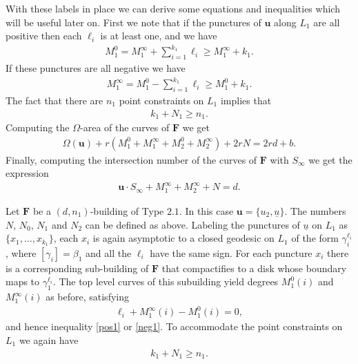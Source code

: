 \documentclass[12pt]{amsart}
\theoremstyle{definition}
\begin{document}
With these labels in place we can derive some equations and inequalities  which will be useful later on. First we note that if the punctures of $\mathbf{u}$ along $L_1$ are all positive then each $\ell_i$ is at least one, and we have 
\begin{align}\label{pos1}
M_1^0 = M_1^\infty + \sum_{i=1}^{k_1} \ell_i \geq M_1^\infty + k_1.
\end{align}
If these punctures are all negative we have 
\begin{align}\label{neg1}
M_1^\infty = M_1^0 - \sum_{i=1}^{k_1} \ell_i \geq M_1^0 + k_1.
\end{align}
The fact that there are  $n_1$ point constraints on $L_1$ implies that 
\begin{align}\label{constraint1}
k_1 + N_1 \geq n_1. 
\end{align}
Computing the $\Omega$-area of the curves of  $\mathbf{F}$ we get
\begin{align}\label{area1}
\Omega (\mathbf{u})+ r(M_1^0 +M_1^\infty + M_2^0 + M_2^\infty)+2rN = 2rd+b.  
\end{align}
Finally, computing the intersection number of the curves of $\mathbf{F}$ with $S_{\infty}$ we get the expression
\begin{align}\label{S1}
\mathbf{u} \cdot S_{\infty}+ M_1^\infty + M_2^\infty + N  =  d.
\end{align}


Let $\mathbf{F}$ be a $(d,n_1)$-building of Type $2.1$. In this case  $\mathbf{u} = \{u_2,\underline{u}\}$. The numbers $N$, $N_0$, $N_1$ and $N_2$ can be defined as above. Labeling the punctures of $\underline{u}$  on $L_1$ as  $\{x_1, \dots, x_{k_1}\}$, each $x_i$ is again asymptotic to a closed geodesic on $L_1$ of the form $\gamma_i^{\ell_i}$, where $[\gamma_i] =\beta_1$ and all the $\ell_i$ have the same sign. For each puncture $x_i$ there is a corresponding sub-building of $\mathbf{F}$ that compactifies to a disk whose boundary maps to $\gamma_1^{\ell_i}$. The top level curves of this subuilding yield degrees $M^0_1(i)$ and $M^\infty_1(i)$ as before,  satisfying
\begin{align}\label{eq:2.1match}
 \ell_i+M^{\infty}_1(i)-M^0_1(i)=0,   
\end{align}
and hence inequality  \eqref{pos1} or \eqref{neg1}. To accommodate the point constraints on $L_1$ we again have 
\begin{align}\label{constraint2}
k_1 + N_1 \geq n_1. 
\end{align}
\end{document}
